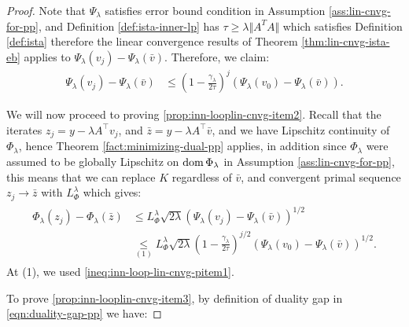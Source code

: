\documentclass[12pt]{article}
\begin{document}
        \begin{proof}
            Note that $\Psi_\lambda$ satisfies error bound condition in Assumption \ref{ass:lin-cnvg-for-pp}, and Definition \ref{def:ista-inner-lp} has $\tau \ge \lambda\Vert A^TA\Vert$ which satisfies Definition \ref{def:ista} therefore the linear convergence results of Theorem \ref{thm:lin-cnvg-ista-eb} applies to $\Psi_\lambda(v_j) - \Psi_\lambda(\bar v)$. 
            Therefore, we claim: 
            \begin{align}\label{ineq:inn-loop-lin-cnvg-pitem1}
                \Psi_\lambda(v_j) - \Psi_\lambda(\bar v) &\le 
                \left(
                    1 - \frac{\gamma_\lambda}{2\tau}
                \right)^j
                \left(
                    \Psi_\lambda(v_0) - \Psi_\lambda(\bar v)
                \right). 
            \end{align}
            \par
            We will now proceed to proving \ref{prop:inn-looplin-cnvg-item2}. 
            Recall that the iterates $z_j = y - \lambda A^\top v_j$, and $\bar z = y - \lambda A^\top \bar v$, and we have Lipschitz continuity of $\Phi_\lambda$, hence Theorem \ref{fact:minimizing-dual-pp} applies, in addition since $\Phi_\lambda$ were assumed to be globally Lipschitz on $\operatorname{dom} \Phi_\lambda$ in Assumption \ref{ass:lin-cnvg-for-pp}, this means that we can replace $K$ regardless of $\bar v$, and convergent primal sequence $z_j \rightarrow \bar z$ with $L_\Phi^\lambda$ which gives: 
            \begin{align}\label{ineq:inn-loop-lin-cnvg-pitem2}
                \begin{split}
                    \Phi_\lambda(z_j) - \Phi_\lambda(\bar z) &\le L_\Phi^\lambda \sqrt{2\lambda}\left(
                    \Psi_\lambda(v_j) - \Psi_\lambda (\bar v)
                    \right)^{1/2}
                    \\
                    &\underset{(1)}{\le} 
                    L_\Phi^\lambda\sqrt{2\lambda} \left(
                        1 - \frac{\gamma_\lambda}{2\tau}
                    \right)^{j/2}\left(
                        \Psi_\lambda(v_0) - \Psi_\lambda(\bar v)
                    \right)^{1/2}. 
                \end{split}
            \end{align}
            At (1), we used \eqref{ineq:inn-loop-lin-cnvg-pitem1}.
            \par
            To prove \ref{prop:inn-looplin-cnvg-item3}, by definition of duality gap in \eqref{eqn:duality-gap-pp} we have:

\end{proof}
\end{document}
